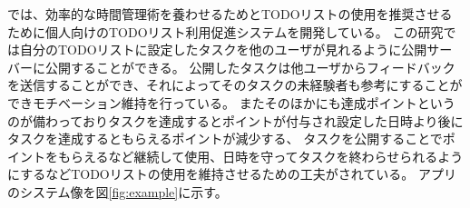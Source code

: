 \cite{report} では、効率的な時間管理術を養わせるためとTODOリストの使用を推奨させるために個人向けのTODOリスト利用促進システムを開発している。
この研究では自分のTODOリストに設定したタスクを他のユーザが見れるように公開サーバーに公開することができる。
公開したタスクは他ユーザからフィードバックを送信することができ、それによってそのタスクの未経験者も参考にすることができモチベーション維持を行っている。
またそのほかにも達成ポイントというのが備わっておりタスクを達成するとポイントが付与され設定した日時より後にタスクを達成するともらえるポイントが減少する、
タスクを公開することでポイントをもらえるなど継続して使用、日時を守ってタスクを終わらせられるようにするなどTODOリストの使用を維持させるための工夫がされている。
アプリのシステム像を図\ref{fig:example}に示す。

